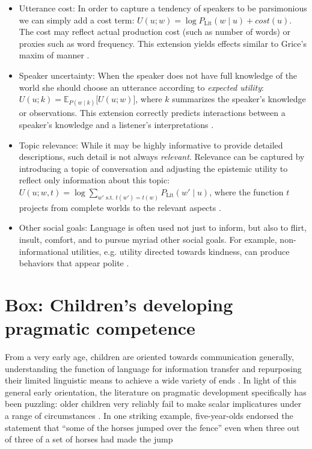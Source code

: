 \documentclass[]{elsarticle}
\begin{document}
\begin{itemize}
\item Utterance cost: In order to capture a tendency of speakers to be
  parsimonious we can simply add a cost term: $U(u; w) =
  \log P_{\text{Lit}}(w\mid u) + cost(u)$. The cost may
  reflect actual production cost (such as number of words) or proxies
  such as word frequency. This extension yields effects similar to
  Grice's maxim of manner \citep{bergen2016}.

\item Speaker uncertainty: When the speaker does not have full knowledge of
  the world she should choose an utterance according to \emph{expected
  utility}: $U(u;k) = {\mathbb E}_{P(w\mid k)}{[}U(u;w){]}$, where $k$
  summarizes the speaker's knowledge or observations. This extension
  correctly predicts interactions between a speaker's knowledge and a
  listener's interpretations \citep{goodman2013}.

\item Topic relevance: While it may be highly informative to provide detailed descriptions, such detail is not always \emph{relevant}. Relevance can be captured by introducing a topic of conversation \citep[sometimes known as a \emph{Question Under Discussion,}][]{roberts1996} and adjusting the epistemic utility to reflect only information about this topic: $U(u;w,t)=\log \sum_{w' \text{ s.t. } t(w')=t(w)} P_{\text{Lit}}(w'\mid u)$, where the function $t$ projects from complete worlds to the relevant aspects \citep{kao2014}. 

\item Other social goals: Language is often used not just to inform, but
  also to flirt, insult, comfort, and to pursue myriad other social
  goals. For example, non-informational utilities, e.g. utility directed towards
  kindness, can produce behaviors that appear polite \citep{yoon2016}.

\end{itemize}

\section{Box: Children's developing pragmatic competence}\label{box-childrens-developing-pragmatic-competence.}

From a very early age, children are oriented towards communication
generally, understanding the function of language for information
transfer and repurposing their limited linguistic means to achieve a
wide variety of ends \citep{vouloumanos2012,clark2010}. In light
of this general early orientation, the literature on pragmatic
development specifically has been puzzling: older children very reliably
fail to make scalar implicatures under a range of circumstances \citep{noveck2001}. In one striking example, five-year-olds endorsed the statement that ``some of the horses jumped over the fence'' even when three out of three of a set of horses had made the jump \citep{papafragou2003}
\end{document}
